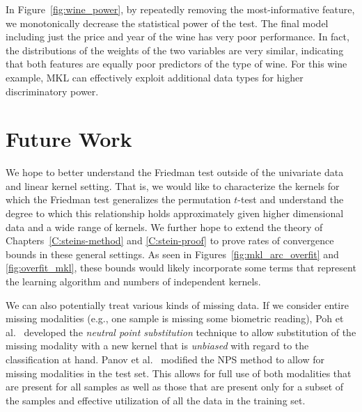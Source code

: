 In Figure~\ref{fig:wine_power}, by repeatedly removing the
most-informative feature, we monotonically decrease the statistical
power of the test.  The final model including just the price and year
of the wine has very poor performance.  In fact, the distributions of
the weights of the two variables are very similar, indicating that
both features are equally poor predictors of the type of wine.  For
this wine example, MKL can effectively exploit additional data types
for higher discriminatory power.

\section{Future Work}
We hope to better understand the Friedman test outside of the
univariate data and linear kernel setting.  That is, we would like to
characterize the kernels for which the Friedman test generalizes the
permutation $t$-test and understand the degree to which this
relationship holds approximately given higher dimensional data and a
wide range of kernels.  We further hope to extend the theory of
Chapters~\ref{C:steins-method} and \ref{C:stein-proof} to prove rates
of convergence bounds in these general settings.  As seen in
Figures~\ref{fig:mkl_arc_overfit} and \ref{fig:overfit_mkl}, these bounds
would likely incorporate some terms that represent the learning
algorithm and numbers of independent kernels.

We can also potentially treat various kinds of missing data.
If we consider entire missing modalities (e.g., one sample is
missing some biometric reading), Poh et al.\ \cite{poh2010addressing}
developed the \emph{neutral point substitution} technique to allow
substitution of the missing modality with a new kernel that is
\emph{unbiased} with regard to the classification at hand.
Panov et al.\ \cite{panov2011modified} modified the NPS method to allow
for missing modalities in the test set.  This
allows for full use of both modalities that are present for all
samples as well as those that are present only for a subset of the
samples and effective utilization of all the data in the training set.
